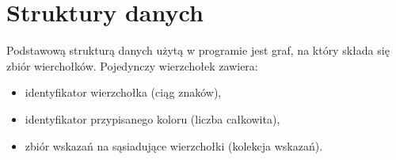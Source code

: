 \section{Struktury danych}
Podstawową strukturą danych użytą w programie jest graf, na który składa się zbiór wierchołków.
Pojedynczy wierzchołek zawiera:
\begin{itemize}
 \item identyfikator wierzchołka (ciąg znaków),
 \item identyfikator przypisanego koloru (liczba całkowita),
 \item zbiór wskazań na sąsiadujące wierzchołki (kolekcja wskazań).
\end{itemize}
